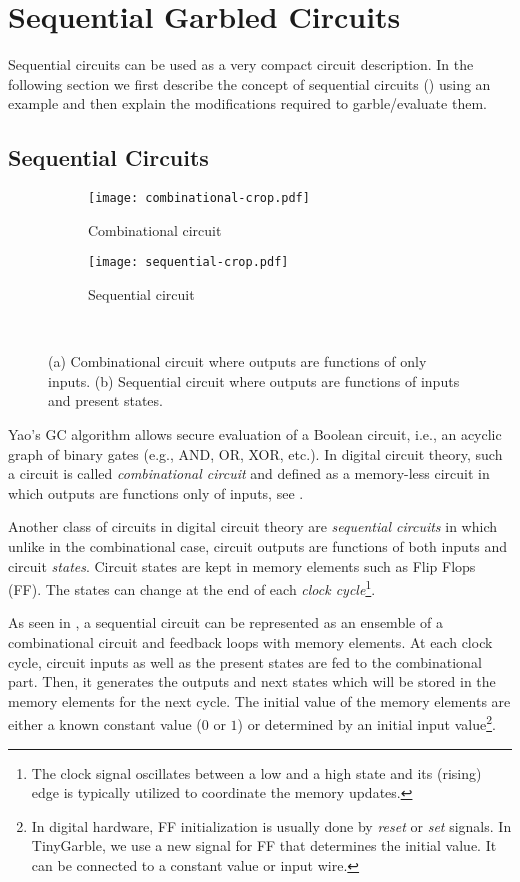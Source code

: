 \chapter{Sequential Garbled Circuits}
Sequential circuits can be used as a very compact circuit description.
In the following section we first describe the concept of sequential circuits () using an example and then explain the modifications required to garble/evaluate them.

\section{Sequential Circuits}

\begin{figure}[ht]
    \centering
    \begin{subfigure}[t]{0.35\textwidth}
        \texttt{[image: combinational-crop.pdf]}
        \caption{Combinational circuit}\label{fig:combinational}
    \end{subfigure}
    \begin{subfigure}[t]{0.30\textwidth}
        \texttt{[image: sequential-crop.pdf]}
        \caption{Sequential circuit}\label{fig:sequential}
    \end{subfigure}\\
    \caption{(a) Combinational circuit where outputs are functions of only inputs.
    (b) Sequential circuit where outputs are functions of inputs and present states.}
\end{figure}

Yao's GC algorithm allows secure evaluation of a Boolean circuit, i.e., an acyclic graph of binary gates (e.g., AND, OR, XOR, etc.).
In digital circuit theory, such a circuit is called \emph{combinational circuit} and defined as a memory-less circuit in which outputs are functions only of inputs, see .

Another class of circuits in digital circuit theory are \emph{sequential circuits} in which unlike in the combinational case, circuit outputs are functions of both inputs and circuit \emph{states}.
Circuit states are kept in memory elements such as Flip Flops (FF).
The states can change at the end of each \emph{clock cycle}\footnote{The clock signal oscillates between a low and a high state and its (rising) edge is typically utilized to coordinate the memory updates.}.

As seen in , a sequential circuit can be represented as an ensemble of a combinational circuit and feedback loops with memory elements.
At each clock cycle, circuit inputs as well as the present states are fed to the combinational part.
Then, it generates the outputs and next states which will be stored in the memory elements for the next cycle.
The initial value of the memory elements are either a known constant value ($0$ or $1$) or determined by an initial input value\footnote{In digital hardware, FF initialization is usually done by \emph{reset} or \emph{set} signals.
In TinyGarble, we use a new signal for FF that determines the initial value.
It can be connected to a constant value or input wire.}.

